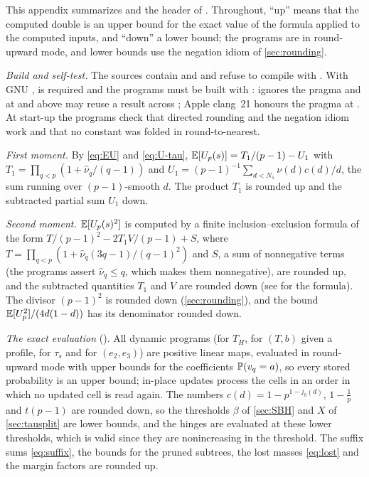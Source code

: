 This appendix summarizes  and the header of .
Throughout, ``up'' means that the computed double is an upper bound for the exact value of the formula applied to the
computed inputs, and ``down'' a lower bound; the programs are in round-upward mode, and lower bounds use the negation
idiom of \cref{sec:rounding}.

\emph{Build and self-test.} The sources contain  and 
and refuse to compile with . With GNU ,  is required and the
programs must be built with :  ignores the  pragma and at  and above
may reuse a result across ; Apple clang~21 honours the pragma at . At start-up
the programs check that directed rounding and the negation idiom work and that no constant was folded in
round-to-nearest.

\emph{First moment.} By \eqref{eq:EU} and \eqref{eq:U-tau}, $\E[U_p(s)]=T_1/(p-1)-U_1$ with
$T_1=\prod_{q<p}(1+\hat\nu_q/(q-1))$ and $U_1=(p-1)^{-1}\sum_{d<N_1}\nu(d)c(d)/d$, the sum running over
$(p-1)$-smooth $d$. The product $T_1$ is rounded up and the subtracted partial sum $U_1$ down.

\emph{Second moment.} $\E[U_p(s)^2]$ is computed by a finite inclusion--exclusion formula of the form
$T/(p-1)^2-2T_1V/(p-1)+S$, where $T=\prod_{q<p}(1+\hat\nu_q(3q-1)/(q-1)^2)$ and $S$, a sum of nonnegative terms
(the programs assert $\hat\nu_q\le q$, which makes them nonnegative), are rounded up, and the subtracted quantities
$T_1$ and $V$ are rounded down (see  for the formula). The divisor $(p-1)^2$ is rounded down
(\cref{sec:rounding}), and the bound $\E[U_p^2]/(4d(1-d))$ has its denominator rounded down.

\emph{The exact evaluation} (). All dynamic programs (for $T_H$, for $(T,b)$ given a profile, for
$\tau_s$ and for $(e_2,e_3)$) are positive linear maps, evaluated in round-upward mode with upper bounds for the
coefficients $\P(v_q=a)$, so every stored probability is an upper bound; in-place updates process the cells in an
order in which no updated cell is read again. The numbers $c(d)=1-p^{1-j_0(d)}$, $1-\frac1p$ and $t(p-1)$ are rounded
down, so the thresholds $\beta$ of \cref{sec:SBH} and $X$ of \cref{sec:tausplit} are lower bounds, and the hinges
are evaluated at these lower thresholds, which is valid since they are nonincreasing in the threshold. The suffix
sums \eqref{eq:suffix}, the bounds for the pruned subtrees, the lost masses \eqref{eq:lost} and the margin factors are
rounded up.

